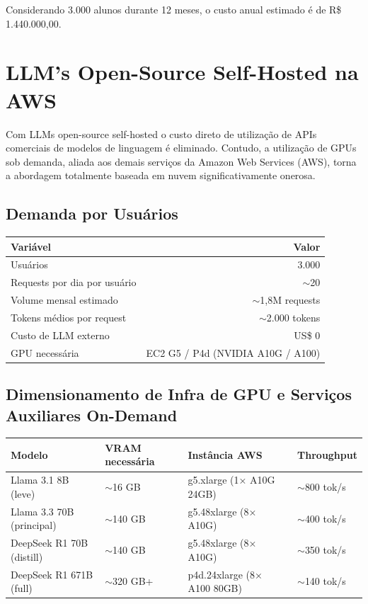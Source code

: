 \documentclass[12pt,a4paper,]{abntex2}
\begin{document}
Considerando 3.000 alunos durante 12 meses, o custo anual estimado é de R\$ 1.440.000,00.

\section{LLM's Open-Source Self-Hosted na AWS}

Com LLMs open-source self-hosted o custo direto de utilização de APIs comerciais de modelos de linguagem é eliminado. Contudo, a utilização de GPUs sob demanda, aliada aos demais serviços da Amazon Web Services (AWS), torna a abordagem totalmente baseada em nuvem significativamente onerosa.

\subsection{Demanda por Usuários}

\begin{table}[h]
\centering
\begin{tabular}{|l|r|}
\hline
\textbf{Variável} & \textbf{Valor} \\
\hline
Usuários & 3.000 \\
Requests por dia por usuário & $\sim$20 \\
Volume mensal estimado & $\sim$1,8M requests \\
Tokens médios por request & $\sim$2.000 tokens \\
Custo de LLM externo & US\$ 0 \\
GPU necessária & EC2 G5 / P4d (NVIDIA A10G / A100) \\
\hline
\end{tabular}
\end{table}

\newpage
\subsection{Dimensionamento de Infra de GPU e Serviços Auxiliares On-Demand}

\begin{table}[h]
\centering
\begin{tabular}{|l|l|l|l|}
\hline
\textbf{Modelo} & \textbf{VRAM necessária} & \textbf{Instância AWS} & \textbf{Throughput} \\
\hline
Llama 3.1 8B (leve) & $\sim$16 GB & g5.xlarge (1× A10G 24GB) & $\sim$800 tok/s \\
Llama 3.3 70B (principal) & $\sim$140 GB & g5.48xlarge (8× A10G) & $\sim$400 tok/s \\
DeepSeek R1 70B (distill) & $\sim$140 GB & g5.48xlarge (8× A10G) & $\sim$350 tok/s \\
DeepSeek R1 671B (full) & $\sim$320 GB+ & p4d.24xlarge (8× A100 80GB) & $\sim$140 tok/s \\
\hline
\end{tabular}
\end{table}
\end{document}
